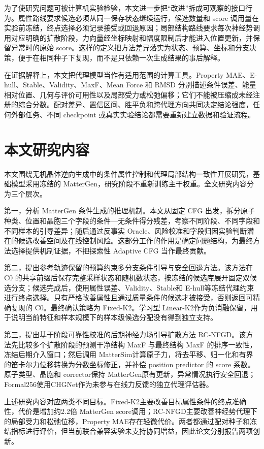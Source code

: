 为了使研究问题可被计算机实验检验，本文进一步把``改进''拆成可观察的接口行为。属性路线要求候选必须从同一保存状态继续运行，候选数量和 score 调用量在实验前冻结，终点选择必须记录接受或回退原因；局部结构路线要求每次神经势调用对应明确的扩散阶段，力向量经坐标映射和幅度限制后才能进入位置更新，并保留异常时的原始 score。这样的定义把方法差异落实为状态、预算、坐标和分支决策，便于在相同种子下复现，而不是只依赖一次生成结果的事后解释。

在证据解释上，本文把代理模型当作有适用范围的计算工具。Property MAE、E-hull、Stable、Validity、MaxF、Mean Force 和 RMSD 分别描述条件误差、能量相对位置、几何与评价可用性以及局部受力或松弛偏移；它们不能被压缩成未经注册的综合分数。配对差异、置信区间、胜平负和跨代理方向共同决定结论强度，任何外部任务、不同 checkpoint 或真实实验结论都需要重新建立数据和验证流程。

\section{本文研究内容}

本文围绕无机晶体逆向生成中的条件属性控制和代理局部结构一致性开展研究，基础模型采用冻结的 MatterGen，研究阶段不重新训练主干权重。全文研究内容分为三个层次。

第一，分析 MatterGen 条件生成的推理机制。本文从固定 CFG 出发，拆分原子种类、位置和晶胞三个字段的条件---无条件得分残差，考察不同阶段、不同字段和不同样本的引导差异；随后通过反事实 Oracle、风险校准和字段归因实验判断潜在的候选改善空间及在线控制风险。这部分工作的作用是确定问题结构，为最终方法选择提供机制证据，不把探索性 Adaptive CFG 当作最终贡献。

第二，提出参考轨迹保留的预算约束多分支条件引导与安全回退方法。该方法在 C0 的共享前缀后保存完整采样状态和随机数状态，按冻结的候选库展开固定双候选分支；候选完成后，使用属性误差、Validity、Stable和 E-hull等冻结代理约束进行终点选择。只有严格改善属性且通过质量条件的候选才被接受，否则返回可精确复现的 C0。最终确认策略为 Fixed-K2。学习型 Linear-K2作为负消融保留，用于说明当前特征和样本规模下的样本级候选分配没有得到独立支持。

第三，提出基于阶段可靠性校准的后期神经力场引导扩散方法 RC-NFGD。该方法先比较多个扩散阶段的预测干净结构 MaxF 与最终结构 MaxF 的排序一致性，冻结后期介入窗口；然后调用 Matter\allowbreak Sim计算原子力，将去平移、归一化和有界的笛卡尔力位移转换为分数坐标修正，并补偿 position predictor 的 score 系数。原子类型、晶胞和 corrector保持 MatterGen原有更新，异常情况执行安全回退；Formal256使用CHGNet作为未参与在线力反馈的独立代理评估器。

上述研究内容对应两类不同目标。Fixed-K2主要改善目标属性条件的终点准确性，代价是增加约2.2倍 MatterGen score调用；RC-NFGD主要改善神经势代理下的局部受力和松弛位移，Property MAE存在轻微代价。两者都通过配对种子和冻结指标进行评价，但当前联合兼容实验未支持协同增益，因此论文分别报告两项创新。


